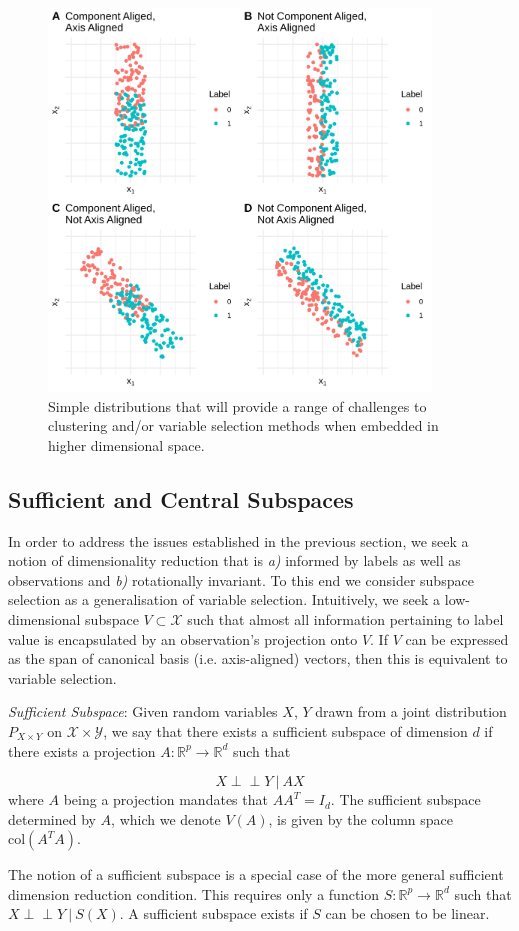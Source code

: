 \documentclass[12pt]{article}
\newenvironment{definition}[1][Definition]{\begin{trivlist}
\item[\hskip \labelsep {\bfseries #1}]}{\end{trivlist}}
\begin{document}
\begin{figure}[htbp]
\centering
\includegraphics[width=4in]{figures/ExampleFigures.png}
\caption{Simple distributions that will provide a range of challenges to clustering and/or variable selection methods when embedded in higher dimensional space.\label{fig:examplefigures}}
\end{figure}

\subsection{Sufficient  and Central Subspaces}
In order to address the issues established in the previous section, we seek a notion of dimensionality reduction that is \textit{a)} informed by labels as well as observations and \textit{b)} rotationally invariant. To this end we consider subspace selection as a generalisation of variable selection. Intuitively, we seek a low-dimensional subspace $V \subset \mathcal{X}$ such that almost all information pertaining to label value is encapsulated by an observation's projection onto $V$. If $V$ can be expressed as the span of canonical basis (i.e. axis-aligned) vectors, then this is equivalent to variable selection. 

\begin{definition}
\textit{Sufficient Subspace}: Given random variables $X$, $Y$ drawn from a joint distribution $P_{X\times Y}$ on $\mathcal{X} \times \mathcal{Y}$, we say that there exists a sufficient subspace of dimension $d$ if there exists a projection $A : \mathbb{R}^p \rightarrow \mathbb{R}^d $ such that 

\[
X \perp\!\!\!\perp Y\ | \ AX
\]
where $A$ being a projection mandates that $A {A}^T = I_d$. The sufficient subspace determined by $A$, which we denote $V(A)$, is given by the column space $\text{col}(A^TA)$.
\end{definition}
The notion of a sufficient subspace is a special case of the more general sufficient dimension reduction condition. This requires only a function $S:\mathbb{R}^p\rightarrow \mathbb{R}^d$ such that $X \perp\!\!\!\perp Y\ | \ S(X)$. A sufficient subspace exists if $S$ can be chosen to be linear. 
\end{document}
